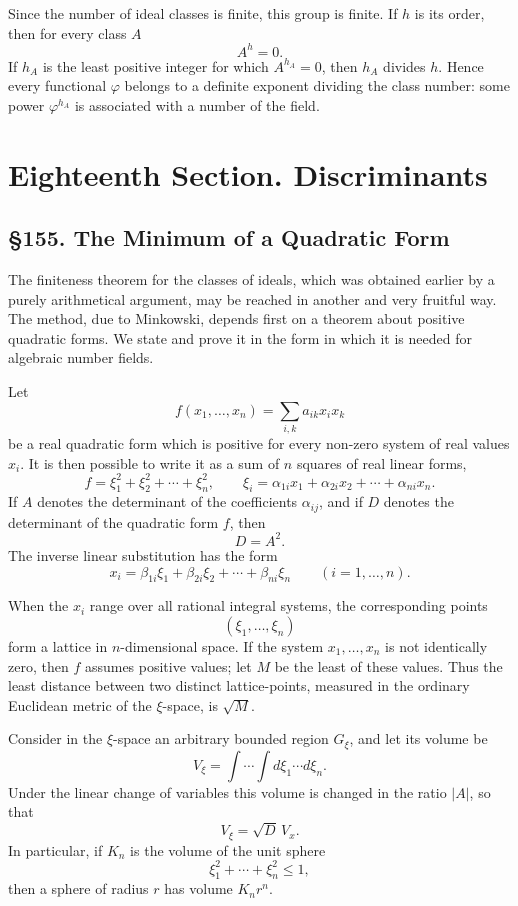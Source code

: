 \documentclass[11pt,a4paper]{book}
\newcommand{\webersection}[2]{\clearpage\section*{\S #1. #2}}
\newcommand{\booktitle}[1]{\clearpage\chapter*{#1}}
\begin{document}
Since the number of ideal classes is finite, this group is finite.  If \(h\) is its order, then for every class \(A\)
\begin{equation}
 A^h=0. \tag{3}
\end{equation}
If \(h_A\) is the least positive integer for which \(A^{h_A}=0\), then \(h_A\) divides \(h\).  Hence every functional \(\varphi\) belongs to a definite exponent dividing the class number: some power \(\varphi^{h_A}\) is associated with a number of the field.

\booktitle{Eighteenth Section. Discriminants}

\webersection{155}{The Minimum of a Quadratic Form}

The finiteness theorem for the classes of ideals, which was obtained earlier by a purely arithmetical argument, may be reached in another and very fruitful way.  The method, due to Minkowski, depends first on a theorem about positive quadratic forms.  We state and prove it in the form in which it is needed for algebraic number fields.

Let
\[
  f(x_1,\ldots,x_n)=\sum_{i,k} a_{ik}x_i x_k
\]
be a real quadratic form which is positive for every non-zero system of real values \(x_i\).  It is then possible to write it as a sum of \(n\) squares of real linear forms,
\[
  f=\xi_1^2+\xi_2^2+\cdots+\xi_n^2,\qquad
  \xi_i=\alpha_{1i}x_1+\alpha_{2i}x_2+\cdots+\alpha_{ni}x_n.
\]
If \(A\) denotes the determinant of the coefficients \(\alpha_{ij}\), and if \(D\) denotes the determinant of the quadratic form \(f\), then
\[
  D=A^2.
\]
The inverse linear substitution has the form
\[
  x_i=\beta_{1i}\xi_1+\beta_{2i}\xi_2+\cdots+\beta_{ni}\xi_n
  \qquad (i=1,\ldots,n).
\]

When the \(x_i\) range over all rational integral systems, the corresponding points
\[
  (\xi_1,\ldots,\xi_n)
\]
form a lattice in \(n\)-dimensional space.  If the system \(x_1,\ldots,x_n\) is not identically zero, then \(f\) assumes positive values; let \(M\) be the least of these values.  Thus the least distance between two distinct lattice-points, measured in the ordinary Euclidean metric of the \(\xi\)-space, is \(\sqrt M\).

Consider in the \(\xi\)-space an arbitrary bounded region \(G_\xi\), and let its volume be
\[
  V_\xi=\int\cdots\int d\xi_1\cdots d\xi_n.
\]
Under the linear change of variables this volume is changed in the ratio \(|A|\), so that
\[
  V_\xi=\sqrt D\,V_x.
\]
In particular, if \(K_n\) is the volume of the unit sphere
\[
  \xi_1^2+\cdots+\xi_n^2\le 1,
\]
then a sphere of radius \(r\) has volume \(K_n r^n\).
\end{document}
